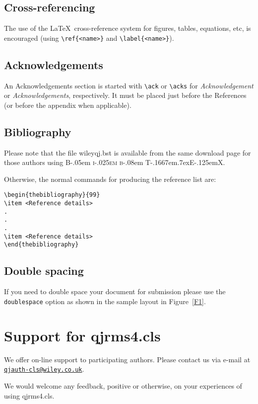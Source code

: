 \documentclass[times]{qjrms4}
\newcommand\BibTeX{{\rmfamily B\kern-.05em \textsc{i\kern-.025em b}\kern-.08em
T\kern-.1667em\lower.7ex\hbox{E}\kern-.125emX}}
\begin{document}
\subsection{Cross-referencing}
The use of the \LaTeX\ cross-reference system
for figures, tables, equations, etc, is encouraged
(using \verb"\ref{<name>}" and \verb"\label{<name>}").

\subsection{Acknowledgements}
An Acknowledgements section is started with \verb"\ack" or
\verb"\acks" for \textit{Acknowledgement} or
\textit{Acknowledgements}, respectively. It must be placed just
before the References (or before the appendix when applicable).

\subsection{Bibliography}
Please note that the file \textsf{wileyqj.bst} is available from
the same download page for those authors using \BibTeX.

Otherwise, the normal commands for producing the reference list
are:
\begin{verbatim}
\begin{thebibliography}{99}
\item <Reference details>
.
.
.
\item <Reference details>
\end{thebibliography}
\end{verbatim}

\subsection{Double spacing}
If you need to double space your document for submission please
use the \verb+doublespace+ option as shown in the sample layout in
Figure~\ref{F1}.

\section{Support for \textsf{qjrms4.cls}}
We offer on-line support to participating authors.
Please contact us via e-mail at
\href{mailto:qjauth-cls@wiley.co.uk}{\texttt{qjauth-cls@wiley.co.uk}}.

We would welcome any feedback, positive or otherwise, on your
experiences of using \textsf{qjrms4.cls}.
\end{document}
